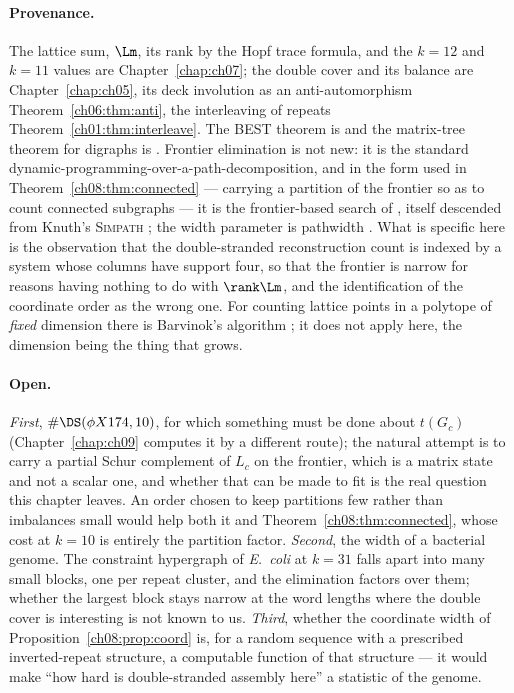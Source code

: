 \paragraph{Provenance.} The lattice sum, $\Lm$, its rank by the Hopf trace formula, and the
$k=12$ and $k=11$ values are Chapter~\ref{chap:ch07}; the double cover and its balance are Chapter~\ref{chap:ch05},
its deck involution as an anti-automorphism Theorem~\ref{ch06:thm:anti}, the interleaving of
repeats Theorem~\ref{ch01:thm:interleave}. The BEST theorem is \cite{BEST,SmithTutte} and the matrix-tree theorem for
digraphs is \cite{Tutte48}. Frontier elimination is not new: it is the standard
dynamic-programming-over-a-path-decomposition, and in the form used in
Theorem~\ref{ch08:thm:connected} --- carrying a partition of the frontier so as to count connected
subgraphs --- it is the frontier-based search of \cite{KIIM17}, itself descended from Knuth's
\textsc{Simpath} \cite{Knuth4A}; the width parameter is pathwidth \cite{Bodlaender98}. What is
specific here is the observation that the double-stranded reconstruction count is indexed by a
system whose columns have support four, so that the frontier is narrow for reasons having
nothing to do with $\rank\Lm$, and the identification of the coordinate order as the wrong one.
For counting lattice points in a polytope of \emph{fixed} dimension there is Barvinok's
algorithm \cite{Barvinok94}; it does not apply here, the dimension being the thing that grows.

\paragraph{Open.} \emph{First}, $\#\DS(\phi X174,10)$, for which something must be done about
$t(G_c)$ (Chapter~\ref{chap:ch09} computes it by a different route); the natural attempt is to carry a partial Schur complement of $L_c$ on the frontier,
which is a matrix state and not a scalar one, and whether that can be made to fit is the real
question this chapter leaves. An order chosen to keep partitions few rather than imbalances small
would help both it and Theorem~\ref{ch08:thm:connected}, whose cost at $k=10$ is entirely the
partition factor. \emph{Second}, the width of a bacterial genome. The
constraint hypergraph of \emph{E.~coli} at $k=31$ falls apart into many small blocks, one per
repeat cluster, and the elimination factors over them; whether the largest block stays narrow
at the word lengths where the double cover is interesting is not known to us. \emph{Third},
whether the coordinate width of Proposition~\ref{ch08:prop:coord} is, for a random sequence with a
prescribed inverted-repeat structure, a computable function of that structure --- it would
make ``how hard is double-stranded assembly here'' a statistic of the genome.
